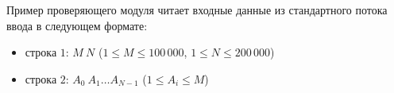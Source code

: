 Пример проверяющего модуля читает входные данные из стандартного потока
ввода в следующем формате:

\begin{itemize}
    \item строка $1$: $M\ N$ ($1 \le M \le 100\,000$, $1 \le N \le 200\,000$)
    \item строка $2$: $A_0\ A_1\ldots A_{N-1}$ ($1 \le A_i \le M$)
\end{itemize}






